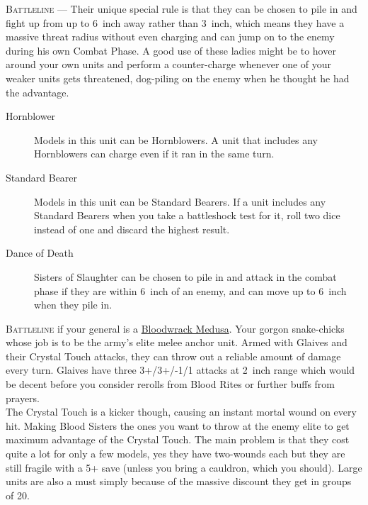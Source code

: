 \textsc{Battleline} --- Their unique special rule is
that they can be chosen to pile in and fight up from up to 6~inch away rather than
3~inch, which means they have a massive threat radius without even charging and can
jump on to the enemy during his own Combat Phase. A good use of these ladies
might be to hover around your own units and perform a counter-charge whenever
one of your weaker units gets threatened, dog-piling on the enemy when he
thought he had the advantage. 
\begin{description}
    \item [Hornblower] Models in this unit can be Hornblowers. A unit that
        includes any Hornblowers can charge even if it ran in the same turn.
    \item [Standard Bearer] Models in this unit can be Standard Bearers. If
        a unit includes any Standard Bearers when you take a battleshock test
        for it, roll two dice instead of one and discard the highest result.
    \item [Dance of Death] Sisters of Slaughter can be chosen to pile in and
        attack in the combat phase if they are within 6~inch of an enemy, and
        can move up to 6~inch when they pile in.
\end{description}

\newpage %

\textsc{Battleline} if your general is
a \hyperref[bloodwrack-medusa]{Bloodwrack Medusa}. Your gorgon snake-chicks
whose job is to be the army's elite melee anchor unit. Armed with Glaives and
their Crystal Touch attacks, they can throw out a reliable amount of damage
every turn. Glaives have three 3+/3+/-1/1 attacks at 2~inch range which would
be decent before you consider rerolls from Blood Rites or further buffs from
prayers.\\
The Crystal Touch is a kicker though, causing an instant mortal wound on every
hit. Making Blood Sisters the ones you want to throw at the enemy elite to get
maximum advantage of the Crystal Touch. The main problem is that they cost
quite a lot for only a few models, yes they have two-wounds each but they are
still fragile with a 5+ save (unless you bring a cauldron, which you should).
Large units are also a must simply because of the massive discount they get in
groups of 20. \\

